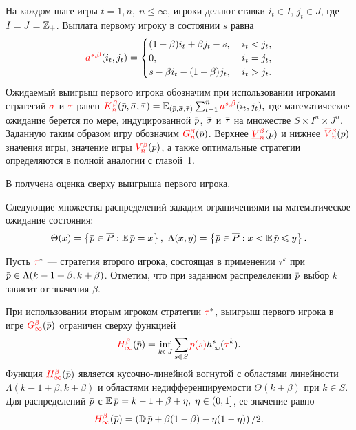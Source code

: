 На каждом шаге игры $t = \overline{1,n}, \; n \leqslant \infty$, игроки делают ставки $i_t \in I, \, j_t \in J$, где $I = J = \mathbb{Z}_+$.
Выплата первому игроку в состоянии $s$ равна
\begin{equation*}
  \as(i_t, j_t) =
  \begin{cases}
    (1-\beta) i_t + \beta j_t - s, &\; i_t < j_t, \\
    0, &\; i_t = j_t, \\
    s - \beta i_t - (1-\beta)j_t, &\; i_t > j_t.
  \end{cases}
\end{equation*}
Ожидаемый выигрыш первого игрока обозначим при использовании игроками стратегий $\textcolor{red}{\sigma}$ и $\textcolor{red}{\tau}$ равен
$
  \K{n}(\p, \sigmav, \tauv) =
  \E_{(\p, \sigmav, \tauv)} \sum_{t=1}^n \as(i_t, j_t),
$
где математическое ожидание берется по мере, индуцированной $\p$, $\sigmav$ и $\tauv$ на множестве $S \times I^n \times J^n$.
Заданную таким образом игру обозначим $\theG{n}(\p)$.
Верхнее $\LowV{n}(p)$ и нижнее $\HighV{n}(p)$ значения игры, значение игры $\V{n}(p)$, а также оптимальные стратегии определяются в полной аналогии с главой~1.

В  получена оценка сверху выигрыша первого игрока.

Следующие множества распределений зададим ограничениями на математическое ожидание состояния:
\begin{gather*}
  \Theta(x) = \left\{ \p \in \MM: \E \p = x \right\},\
  \Lambda(x, y) = \left\{ \p \in \MM: x < \E \p \leqslant y \right\}.
\end{gather*}

Пусть $\textcolor{red}{\tau}^*$ --- стратегия второго игрока, состоящая в применении $\tau^k$ при $\p \in \Lambda(k-1+\beta,k+\beta)$.
Отметим, что при заданном распределении $\p$ выбор $k$ зависит от значения $\beta$.

\begin{theorem}
  \label{ch2:upper-bound:theorem}
  При использовании вторым игроком стратегии $\textcolor{red}{\tau}^*$, выигрыш первого игрока в игре
  $\theG{\infty}(\p)$ ограничен сверху функцией
  \begin{equation*}
    \H{\infty}(\p) = \inf_{k \in J} \sum_{s \in S} \pc{s}  h^s_\infty(\taur^k).
  \end{equation*}
  Функция $\H{\infty}(\p)$ является кусочно-линейной вогнутой с областями линейности $\Lambda(k - 1 + \beta, k + \beta)$ и областями недифференцируемости $\Theta(k+\beta)$ при $k \in S$.
  Для распределений $\p$ с $\E \p = k - 1 + \beta + \eta, \; \eta \in (0, 1]$, ее значение равно
  \begin{equation}
    \label{ch2:upper-bound:eq:H(p)}
    \H{\infty}(\p) = \left( \D \p + \beta(1-\beta) - \eta(1-\eta) \right)/2.
  \end{equation}
\end{theorem}

